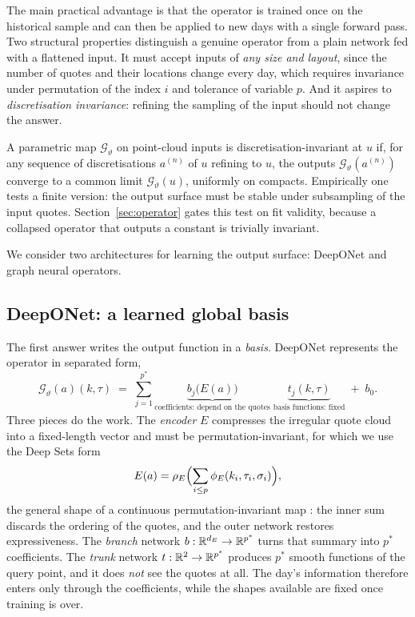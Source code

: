 The main practical advantage is that the operator is trained once on the historical sample and
can then be applied to new days with a single forward pass. Two structural properties distinguish
a genuine operator from a plain network fed with a flattened input. It must accept inputs of
\emph{any size and layout}, since the number of quotes and their locations change every day,
which requires invariance under permutation of the index $i$ and tolerance of variable $p$. And
it aspires to \emph{discretisation invariance}: refining the sampling of the input should not
change the answer.

\begin{definition}\label{def:discinv}
A parametric map $\mathcal G_\vartheta$ on point-cloud inputs is discretisation-invariant at $u$
if, for any sequence of discretisations $a^{(n)}$ of $u$ refining to $u$, the outputs
$\mathcal G_\vartheta(a^{(n)})$ converge to a common limit $\mathcal G_\vartheta(u)$, uniformly
on compacts. Empirically one tests a finite version: the output surface must be stable under
subsampling of the input quotes. Section~\ref{sec:operator} gates this test on fit validity,
because a collapsed operator that outputs a constant is trivially invariant.
\end{definition}

We consider two architectures for learning the output surface: DeepONet and graph neural
operators.

\subsection{DeepONet: a learned global basis}

The first answer writes the output function in a \emph{basis}. DeepONet \cite{lu2021} represents
the operator in separated form,
\begin{equation}\label{eq:deeponet}
\mathcal G_\vartheta(a)(k,\tau)\;=\;\sum_{j=1}^{p^\ast}
\underbrace{b_j\bigl(E(a)\bigr)}_{\text{coefficients: depend on the quotes}}\;
\underbrace{t_j(k,\tau)}_{\text{basis functions: fixed}}\;+\;b_0 .
\end{equation}
Three pieces do the work. The \emph{encoder} $E$ compresses the irregular quote cloud into a
fixed-length vector and must be permutation-invariant, for which we use the Deep Sets form
\begin{equation}\label{eq:deepsets}
E(a)=\rho_E\Bigl(\sum_{i\le p}\phi_E(k_i,\tau_i,\sigma_i)\Bigr),
\end{equation}
the general shape of a continuous permutation-invariant map \cite{zaheer2017}: the inner sum
discards the ordering of the quotes, and the outer network restores expressiveness. The
\emph{branch} network $b:\mathbb{R}^{d_E}\to\mathbb{R}^{p^\ast}$ turns that summary into $p^\ast$ coefficients.
The \emph{trunk} network $t:\mathbb{R}^2\to\mathbb{R}^{p^\ast}$ produces $p^\ast$ smooth functions of the query
point, and it does \emph{not} see the quotes at all. The day's information therefore enters only
through the coefficients, while the shapes available are fixed once training is over.

